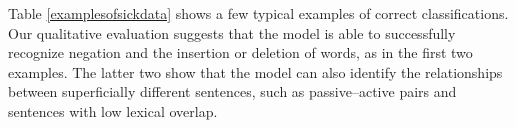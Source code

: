
Table \ref{examplesofsickdata} shows a few typical examples of correct classifications. Our qualitative evaluation suggests that the model is able to successfully recognize negation and the insertion or deletion of words, as in the first two examples. The latter two show that the model can also identify the relationships between superficially different sentences, such as passive--active pairs and sentences with low lexical overlap.